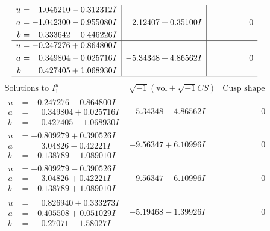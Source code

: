 \documentclass[1p]{elsarticle_modified}
\theoremstyle{definition}
\newcommand{\I}{\sqrt{-1}}
\begin{document}
$$\begin{array}{c|c|c}
\begin{aligned}
u &= \phantom{-}1.045210 - 0.312312 I \\
a &= -1.042300 - 0.955080 I \\
b &= -0.333642 - 0.446226 I\end{aligned}
 & \phantom{-}2.12407 + 0.35100 I & \phantom{-0.000000 } 0 \\ \hline\begin{aligned}
u &= -0.247276 + 0.864800 I \\
a &= \phantom{-}0.349804 - 0.025716 I \\
b &= \phantom{-}0.427405 + 1.068930 I\end{aligned}
 & -5.34348 + 4.86562 I & \phantom{-0.000000 } 0\\
 \hline 
 \end{array}$$\newpage$$\begin{array}{c|c|c}  
\text{Solutions to }I^u_{1}& \I (\text{vol} + \sqrt{-1}CS) & \text{Cusp shape}\\
 \hline 
\begin{aligned}
u &= -0.247276 - 0.864800 I \\
a &= \phantom{-}0.349804 + 0.025716 I \\
b &= \phantom{-}0.427405 - 1.068930 I\end{aligned}
 & -5.34348 - 4.86562 I & \phantom{-0.000000 } 0 \\ \hline\begin{aligned}
u &= -0.809279 + 0.390526 I \\
a &= \phantom{-}3.04826 - 0.42221 I \\
b &= -0.138789 - 1.089010 I\end{aligned}
 & -9.56347 + 6.10996 I & \phantom{-0.000000 } 0 \\ \hline\begin{aligned}
u &= -0.809279 - 0.390526 I \\
a &= \phantom{-}3.04826 + 0.42221 I \\
b &= -0.138789 + 1.089010 I\end{aligned}
 & -9.56347 - 6.10996 I & \phantom{-0.000000 } 0 \\ \hline\begin{aligned}
u &= \phantom{-}0.826940 + 0.333273 I \\
a &= -0.405508 + 0.051029 I \\
b &= \phantom{-}0.27071 - 1.58027 I\end{aligned}
 & -5.19468 - 1.39926 I & \phantom{-0.000000 } 0 \\ \hline\begin{aligned}

\end{aligned}
\end{array}$$
\end{document}

